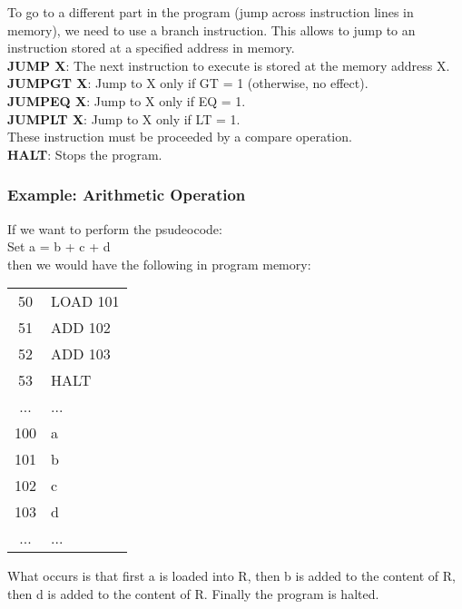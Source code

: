 \documentclass[]{article}
\begin{document}
To go to a different part in the program (jump across instruction lines in memory), we need to use a branch instruction. This allows to jump to an instruction stored at a specified address in memory. \\

\textbf{JUMP X}: The next instruction to execute is stored at the memory address X.\\

\textbf{JUMPGT X}: Jump to X only if GT = 1 (otherwise, no effect). \\
\textbf{JUMPEQ X}: Jump to X only if EQ = 1.\\
\textbf{JUMPLT X}: Jump to X only if LT = 1.\\
These instruction must be proceeded by a compare operation.\\

\textbf{HALT}: Stops the program.\\

\subsubsection{Example: Arithmetic Operation}
\bigbreak

If we want to perform the psudeocode:\\

Set a = b + c + d\\

then we would have the following in program memory: \\

\begin{center}
	\begin{tabular}{c|l|}\cline{2-2}
		50 & LOAD 101 \\\cline{2-2}
		51 & ADD 102 \\\cline{2-2}
		52 & ADD 103 \\\cline{2-2}
		53 & HALT \\\cline{2-2}
		... & ... \\\cline{2-2}
		100 & a \\\cline{2-2}
		101 & b \\\cline{2-2}
		102 & c \\\cline{2-2}
		103 & d \\\cline{2-2}
		... & ... \\\cline{2-2}
	\end{tabular}
	\bigbreak
\end{center}

What occurs is that first a is loaded into R, then b is added to the content of R, then d is added to the content of R. Finally the program is halted.\\
\end{document}
